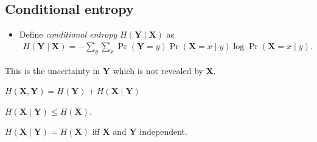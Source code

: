\documentclass{beamer}
\let\stoch\mathbf{}
\begin{document}
\subsection{Conditional entropy}

\begin{frame}
  \begin{definition}
    \begin{itemize}
      \item Define \emph{conditional entropy} \(H(\stoch Y\mid \stoch X)\) 
        as
        \begin{align*}
          H(\stoch Y\mid \stoch X) = %
          -\sum_y\sum_x \Pr(\stoch Y = y)\Pr(\stoch X = x\mid y)\log \Pr(\stoch 
          X = x\mid y).
        \end{align*}
    \end{itemize}
  \end{definition}

  \pause{}

  \begin{remark}
    This is the uncertainty in \(\stoch Y\) which is not revealed by \(\stoch 
      X\).
  \end{remark}
\end{frame}

\begin{frame}
  \begin{theorem}
    \(H(\stoch X, \stoch Y) = H(\stoch Y) + H(\stoch X\mid \stoch Y)\)
  \end{theorem}
%
%
  \begin{corollary}
    \(H(\stoch X\mid \stoch Y) \leq H(\stoch X)\).
  \end{corollary}

  \begin{corollary}
    \(H(\stoch X\mid \stoch Y) = H(\stoch X)\) iff \(\stoch X\) and \(\stoch 
      Y\) independent.
  \end{corollary}
\end{frame}
%
%
\end{document}
